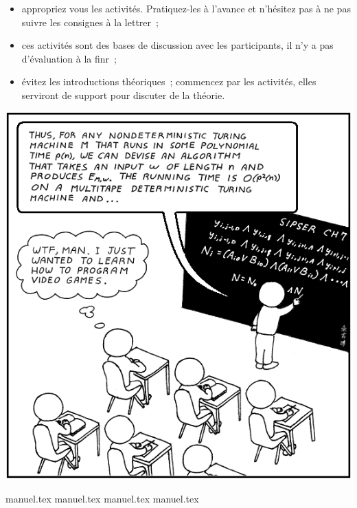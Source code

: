 \documentclass[a5paper,pagesize,DIV=14]{scrbook}
\begin{document}
\begin{itemize}
\item appropriez vous les activités. Pratiquez-les à l'avance et n'hésitez pas à ne pas suivre les consignes à la lettrer~;
\item ces activités sont des bases de discussion avec les participants, il n'y a pas d'évaluation à la finr~;
\item évitez les introductions théoriques~; commencez par les activités, elles serviront de support pour discuter de la théorie.
\end{itemize}

\begin{center}
  \includegraphics[width=0.7\linewidth]{img/computer_science_major.PNG}
  \label{img:CSmajor}
\end{center}

{manuel.tex}
{manuel.tex}
{manuel.tex}
{manuel.tex}
\end{document}
